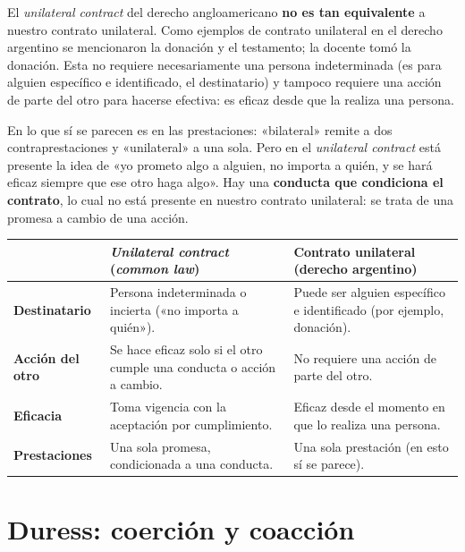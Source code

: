 \documentclass[12pt,oneside]{book}
\begin{document}
El \textit{unilateral contract} del derecho angloamericano \textbf{no es tan equivalente} a nuestro contrato unilateral. Como ejemplos de contrato unilateral en el derecho argentino se mencionaron la donación y el testamento; la docente tomó la donación. Esta no requiere necesariamente una persona indeterminada (es para alguien específico e identificado, el destinatario) y tampoco requiere una acción de parte del otro para hacerse efectiva: es eficaz desde que la realiza una persona.

En lo que sí se parecen es en las prestaciones: «bilateral» remite a dos contraprestaciones y «unilateral» a una sola. Pero en el \textit{unilateral contract} está presente la idea de «yo prometo algo a alguien, no importa a quién, y se hará eficaz siempre que ese otro haga algo». Hay una \textbf{conducta que condiciona el contrato}, lo cual no está presente en nuestro contrato unilateral: se trata de una promesa a cambio de una acción.


\begin{table}[H]
\centering
\begin{tabularx}{\textwidth}{P{2.8cm}LL}
\toprule
 & \textbf{\textit{Unilateral contract} (\textit{common law})} & \textbf{Contrato unilateral (derecho argentino)} \\
\midrule
\textbf{Destinatario} & Persona indeterminada o incierta («no importa a quién»). & Puede ser alguien específico e identificado (por ejemplo, donación). \\
\textbf{Acción del otro} & Se hace eficaz solo si el otro cumple una conducta o acción a cambio. & No requiere una acción de parte del otro. \\
\textbf{Eficacia} & Toma vigencia con la aceptación por cumplimiento. & Eficaz desde el momento en que lo realiza una persona. \\
\textbf{Prestaciones} & Una sola promesa, condicionada a una conducta. & Una sola prestación (en esto sí se parece). \\
\bottomrule
\end{tabularx}
\end{table}

\section{Duress: coerción y coacción}
\end{document}
